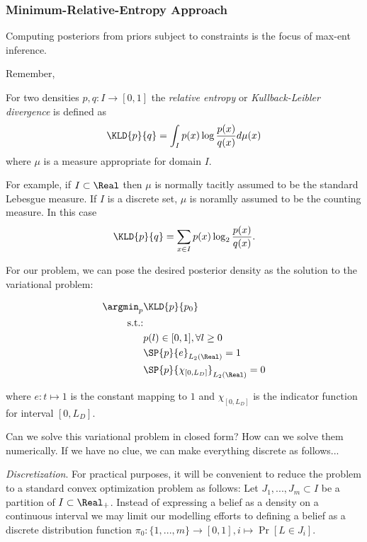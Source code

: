 \subsubsection{Minimum-Relative-Entropy Approach} 

Computing posteriors from priors subject to constraints is the focus of max-ent inference. 

Remember, 
\begin{defn} For two densities $p,q: I  \to [0,1]$ the \textit{relative entropy} or \textit{Kullback-Leibler divergence} is defined as 
\[\KLD {p}{q} = \int_{I} p(x) \log \frac{p(x)}{q(x)} d\mu(x)\] where $\mu$ is a measure appropriate for domain $I$.
\end{defn}

For example, if $I \subset \Real$ then $\mu$ is normally tacitly assumed to be the standard Lebesgue measure. If $I$ is a discrete set, $\mu$ is noramlly assumed to be the counting measure. In this case \[\KLD {p}{q} = \sum_{x\in I} p(x) \log_2 \frac{p(x)}{q(x)}. \]

For our problem, we can pose the desired posterior density as the solution to the variational problem:

\begin{align}
\argmin_p & \KLD {p}{p_0}\\
\text{s.t.:}&\\
& p(l) \in [0,1], \forall l \geq 0\\
&\SP{p}{e}_{L_2(\Real)} =1\\
& \SP{p}{\chi_{[0,L_D]}}_{L_2(\Real)} =0
\end{align}

where $e: t \mapsto 1$ is the constant mapping to $1$ and $\chi_{[0,L_D]}$ is the indicator function for interval $[0,L_D]$.

\begin{ques}
Can we solve this variational problem in closed form? How can we solve them numerically. If we have no clue, we can make everything discrete as follows...
\end{ques}

\emph{Discretization}.
For practical purposes, it will be convenient to reduce the problem to a standard convex optimization problem as follows:
Let $J_1,...,J_m \subset I$ be a partition of $I\subset \Real_+$.
Instead of expressing a belief as a density on a continuous interval we may limit our modelling efforts to defining a belief as a discrete distribution function $\pi_0 : \{ 1,...,m\} \to [0,1], i \mapsto \Pr[ L \in J_i]$.  

